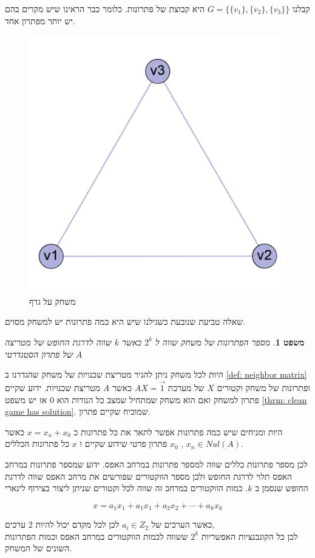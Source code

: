 \documentclass[12pt,leqno]{article}
\newtheorem{theorem}{משפט}[section]
\begin{document}
קבלנו 
$G = \{\{v_1\}, \{v_2\}, \{v_3\} \}$
היא קבוצת של פתרונות.
כלומר כבר הראינו שיש מקרים בהם יש יותר מפתרון אחד.

\begin{figure}[ht]
    \caption{משחק על גרף}
    \label{fig: clic 3 node graph game} 
    \centering
    \includegraphics[width=.5\textwidth,height=.5\textheight,keepaspectratio]{images/clic_graph_3_node.png}
\end{figure}

שאלה טביעת שנובעת כשגילנו שיש היא כמה פתרונות יש למשחק מסוים.

\begin{theorem}
    מספר הפתרונות של משחק 
    שווה ל 
    $2^{k}$
    כאשר 
    $k$
    שווה לדרגת החופש של מטריצה
    $A$
    של פתרון הסטנדרטי
\end{theorem}

היות לכל משחק ניתן להגיר מטריצת שכנויות של משחק שהגדרנו 
ב
\ref{def: neighbor matrix}
ופתרונות של משחק וקטורים
$X$
של מערכת
$A X = \vec{1}$
כאשר 
$A$
מטריצת שכנויות.
ידוע שקיים פתרון למשחק ואם הוא משחק שמתחיל שמצב כל הנורות הוא
$0$
אז יש משפט 
\ref{thrm: clean game has solution}.
שמוכיח שקיים פתרון.

היות ומניחים שיש כמה פתרונות אפשר לתאר את כל פתרונות כ
$x = x_n + x_0$
כאשר 
$x_n \in Nul(A)$ ,
$x_0$ 
פתרון פרטי שידוע שקיים 
ו
$x$
כל פתרונות הכללים.

לכן מספר פתרונות כללים שווה למספר פתרונות במרחב האפס.
ידוע שמספר פתרונות במרחב האפס תלוי לדרגת החופש ולכן מספר הווקטורים שפורשים
את מרחב האפס שווה לדרגת החופש שנסמן ב
$k$.
כמות הווקטורים במרחב זה שווה לכל וקטורים שניתן ליצור בצירוף לינארי 

\[x = a_1 x_1 + a_1 x_1 + a_2 x_2 + \cdots + a_k x_k\]

כאשר הערכים של
$a_i \in Z_2$
לכן 
לכל מקדם יכול להיות
$2$
ערכים,
\\
לכן כל הקונבנציות האפשריות 
$2^k$
ששווה
לכמות הווקטורים 
במרחב האפס וכמות הפתרונות השונים של המשחק.
\end{document}
